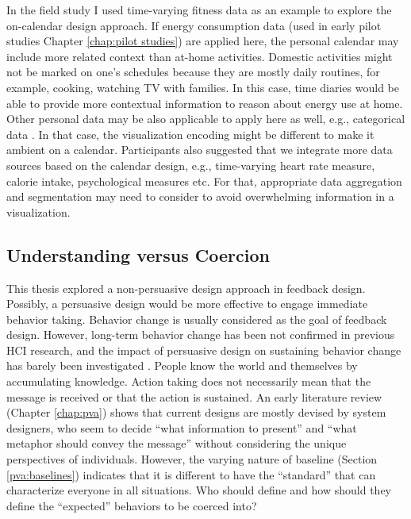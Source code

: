 \documentclass[12pt,oneside]{book}
\begin{document}
In the field study I used time-varying fitness data as an example to explore the on-calendar design approach. If energy consumption data (used in early pilot studies Chapter \ref{chap:pilot studies}) are applied here, the personal calendar may include more related context than at-home activities. Domestic activities might not be marked on one's schedules because they are mostly daily routines, for example, cooking, watching TV with families. In this case, time diaries \cite{ellegard_visualizing_2011} would be able to provide more contextual information to reason about energy use at home.
Other personal data may be also applicable to apply here as well, e.g., categorical data \cite{Tavakkol_2014}. In that case, the visualization encoding might be different to make it ambient on a calendar. Participants also suggested that we integrate more data sources based on the calendar design, e.g., time-varying heart rate measure, calorie intake, psychological measures etc. For that, appropriate data aggregation and segmentation may need to consider to avoid overwhelming information in a visualization.


\subsection {Understanding versus Coercion}
\label{discussion:understanding}
This thesis explored a non-persuasive design approach in feedback design. Possibly, a persuasive design would be more effective to engage immediate behavior taking. Behavior change is usually considered as the goal of feedback design. However, long-term behavior change has been not confirmed in previous HCI research, and the impact of persuasive design on sustaining behavior change has barely been investigated \cite{klasnja_how_2011,brynjarsdottir_sustainably_2012,yetim_critical_2013}. People know the world and themselves by accumulating knowledge. Action taking does not necessarily mean that the message is received or that the action is sustained. 
An early literature review (Chapter \ref{chap:pva}) shows that current designs are mostly devised by system designers, who seem to decide ``what information to present'' and ``what metaphor should convey the message'' without considering the unique perspectives of individuals. However, the varying nature of baseline (Section \ref{pva:baselines}) indicates that it is different to have the ``standard'' that can characterize everyone in all situations. Who should define and how should they define the ``expected'' behaviors to be coerced into?
\end{document}
